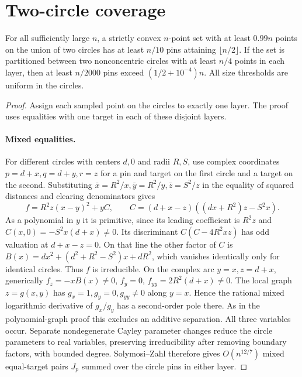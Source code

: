 \section{Two-circle coverage}

\begin{theorem}[982-M01, 982-M02]
For all sufficiently large \(n\), a strictly convex \(n\)-point set with at least
\(0.99n\) points on the union of two circles has at least \(n/10\) pins attaining
\(\lfloor n/2\rfloor\). If the set is partitioned between two nonconcentric circles
with at least \(n/4\) points in each layer, then at least \(n/2000\) pins exceed
\((1/2+10^{-4})n\). All size thresholds are uniform in the circles.
\end{theorem}

\begin{proof}
Assign each sampled point on the circles to exactly one layer. The proof
uses equalities with one target in each of these disjoint layers.

\paragraph{Mixed equalities.}
For different circles with centers \(d,0\) and radii \(R,S\), use complex
coordinates \(p=d+x,q=d+y,r=z\) for a pin and target on the first circle and
a target on the second. Substituting \(\bar x=R^2/x,\bar y=R^2/y,\bar z=S^2/z\)
in the equality of squared distances and clearing denominators gives
\[
 f=R^2z(x-y)^2+yC,\qquad C=(d+x-z)((dx+R^2)z-S^2x).
\]
As a polynomial in \(y\) it is primitive, since its leading coefficient
is \(R^2z\) and \(C(x,0)=-S^2x(d+x)\ne0\). Its discriminant \(C(C-4R^2xz)\)
has odd valuation at \(d+x-z=0\). On that line the other factor of \(C\)
is \(B(x)=dx^2+(d^2+R^2-S^2)x+dR^2\), which vanishes identically only
for identical circles. Thus \(f\) is irreducible. On the complex arc
\(y=x,z=d+x\), generically \(f_z=-xB(x)\ne0\), \(f_y=0\), \(f_{yy}=2R^2(d+x)\ne0\).
The local graph \(z=g(x,y)\) has \(g_x=1,g_y=0,g_{yy}\ne0\) along \(y=x\).
Hence the rational mixed logarithmic derivative of \(g_x/g_y\) has a
second-order pole there. As in the polynomial-graph proof this excludes
an additive separation. All three variables occur. Separate nondegenerate
Cayley parameter changes reduce the circle parameters to real variables,
preserving irreducibility after removing boundary factors, with bounded
degree. Solymosi--Zahl therefore gives \(O(n^{12/7})\) mixed equal-target
pairs \(J_p\) summed over the circle pins in either layer.


\end{proof}
